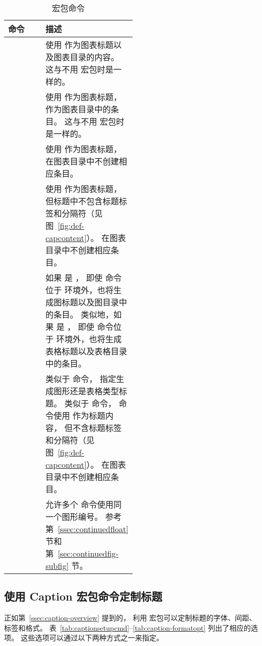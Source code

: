 \begin{sidewaystable}
\centering
\caption{ 宏包命令}\label{tab:caption-cmd}
\begin{tabular}{l P{0.5\linewidth}}
	\toprule
	命令 & 描述 \\
	\midrule
	 & 
	使用  作为图表标题以及图表目录的内容。
	这与不用  宏包时是一样的。 \\
	 & 
	使用  作为图表标题， 作为图表目录中的条目。
	这与不用  宏包时是一样的。 \\
	 & 
	使用  作为图表标题，在图表目录中不创建相应条目。\\
	 & 
	使用  作为图表标题，但标题中不包含标题标签和分隔符（见图~\ref{fig:def-capcontent}）。
	在图表目录中不创建相应条目。\\
	 & 
	如果  是 ，
	即使  命令位于  环境外，也将生成图标题以及图目录中的条目。
	类似地，如果  是 ，
	即使  命令位于  环境外，也将生成表格标题以及表格目录中的条目。\\
	 &
	类似于  命令， 指定生成图形还是表格类型标题。
	类似于  命令， 命令使用  作为标题内容，
	但不含标题标签和分隔符（见图~\ref{fig:def-capcontent}）。
	在图表目录中不创建相应条目。\\
	 &
	允许多个  命令使用同一个图形编号。
	参考第~\ref{ssec:continuedfloat} 节和第~\ref{sec:continuedfig-subfig} 节。\\
	\bottomrule
\end{tabular}
\end{sidewaystable}


\subsection{使用 Caption 宏包命令定制标题} \label{ssec:captioncmd}

正如第~\ref{ssec:caption-overview} 提到的，
利用  宏包可以定制标题的字体、间距、标签和格式。
表~\ref{tab:captionsetupcmd}--\ref{tab:caption-formatopt} 列出了相应的选项。
这些选项可以通过以下两种方式之一来指定。

